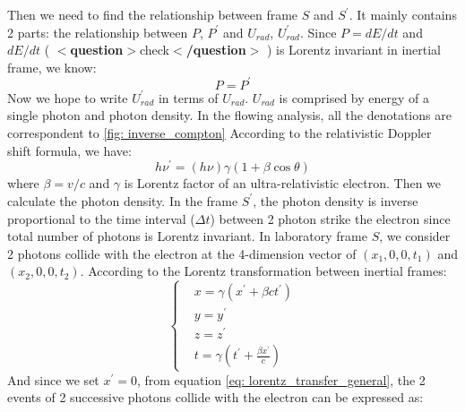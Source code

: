 \documentclass[12pt]{report}
\newcommand{\question}[1]{
  $<$\textbf{question}$>$#1$<$\textbf{/question}$>$
}
\begin{document}
          Then we need to find the relationship between frame $S$ and $S^{\prime}$. It mainly contains 2 
          parts: the relationship between $P$, $P^{\prime}$ and $U_{rad}$, $U_{rad}^{\prime}$. Since 
          $P = dE/dt$ and $dE/dt$ (\question{check}) is Lorentz invariant in inertial frame, we know: 
          \begin{equation}
            \label{eq: power_is_equal}
            P = P^{\prime}
          \end{equation}
          Now we hope to write $U_{rad}^{\prime}$ in terms of $U_{rad}$. $U_{rad}$ is comprised by 
          energy of a single photon and photon density. In the flowing analysis, all the denotations are 
          correspondent to \ref{fig: inverse_compton} According to the relativistic Doppler shift formula,
          we have: 
          \begin{equation}
            \label{eq: doppler_shift}
            h \nu^{\prime} = \left(h \nu\right) \gamma \left(1 + \beta \cos{\theta} \right)
          \end{equation}
          where $\beta = v / c$ and $\gamma$ is Lorentz factor of an ultra-relativistic electron. 
          Then we calculate the photon density. In the frame $S^{\prime}$, the photon density is
          inverse proportional to the time interval ($\Delta t$) between 2 photon strike the electron 
          since total number of photons is Lorentz invariant. In laboratory frame $S$, 
          we consider 2 photons collide with the electron at the 4-dimension vector of 
          $\left(x_{1}, 0, 0, t_{1}\right)$ and $\left(x_{2}, 0, 0, t_{2}\right)$. According to the 
          Lorentz transformation between inertial frames: 
          \begin{equation}
            \label{eq: lorentz_transfer_general}
              \begin{cases}
                 & x = \gamma \left( x^{\prime} + \beta c t^{\prime} \right)\\
                 & y = y^{\prime} \\
                 & z = z^{\prime} \\ 
                 & t = \gamma \left(t^{\prime} + \frac{\beta x^{\prime}}{c}\right)
              \end{cases}       
          \end{equation}
          And since we set $x^{\prime} = 0$, from equation \ref{eq: lorentz_transfer_general}, the 2 
          events of 2 successive photons collide with the electron can be expressed as:
\end{document}
